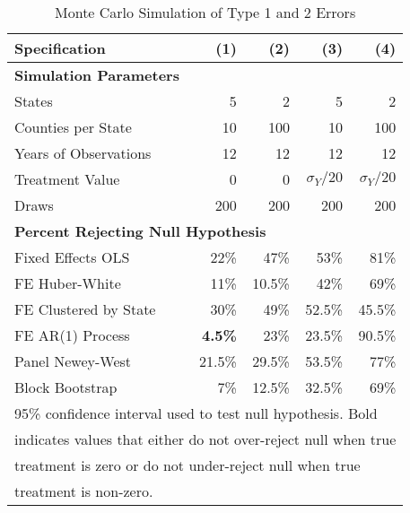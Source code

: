 \documentclass[12pt]{article}
\begin{document}
\begin{table}[H]
	\centering
	\caption{Monte Carlo Simulation of Type 1 and 2 Errors}
	\begin{tabular}{lrrrr} \hline \hline
		Specification &(1) & (2) & (3) & (4)  \\  
		\hline \textbf{Simulation Parameters} & & & & \\
		States &   5 &    2 & 5 & 2\\
		Counties per State &        10 &        100 & 10 & 100\\
		Years of Observations &        12 &        12 & 12 & 12 \\
		Treatment Value &        0 &        0 & $\sigma_{Y}/20$ & $\sigma_{Y}/20$\\
		Draws &       200 & 200 & 200 & 200\\
		\hline \multicolumn{5}{l}{\textbf{Percent Rejecting Null Hypothesis}} \\
		Fixed Effects OLS &      22\% &      47\%& 53\%& 81\%\\
		FE Huber-White &       11\% &       10.5\%& 42\%& 69\%\\
		FE Clustered by State &         30\% &         49\%& 52.5\% & 45.5\%\\
		FE AR(1) Process &         \textbf{4.5\%} &         23\%& 23.5\%& 90.5\%\\
		Panel Newey-West &         21.5\% &         29.5\%& 53.5\% & 77\%\\
		Block Bootstrap &        7\% &         12.5\%& 32.5\%& 69\%\\
		\hline \hline 
		\multicolumn{5}{l}{\footnotesize 95\% confidence interval used to test null hypothesis. Bold  }\\
		\multicolumn{5}{l}{\footnotesize indicates values that either do not over-reject null when true }\\
		\multicolumn{5}{l}{\footnotesize  treatment is zero or do not under-reject null when true  }\\
		\multicolumn{5}{l}{\footnotesize treatment is non-zero. }\\
	\end{tabular}	
	\label{tab:mc_state}
\end{table}
\end{document}
